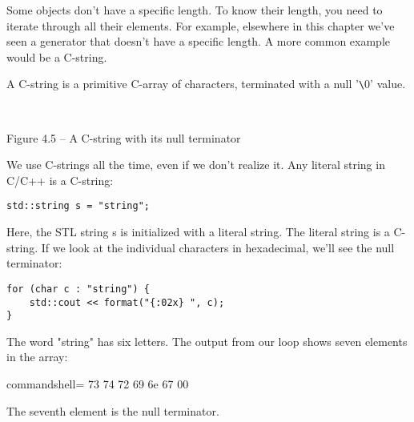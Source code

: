 
Some objects don't have a specific length. To know their length, you need to iterate through all their elements. For example, elsewhere in this chapter we've seen a generator that doesn't have a specific length. A more common example would be a C-string.

A C-string is a primitive C-array of characters, terminated with a null '\verb|\|0' value.


\hspace*{\fill} \\ %
\begin{center}

Figure 4.5 – A C-string with its null terminator
\end{center}

We use C-strings all the time, even if we don't realize it. Any literal string in C/C++ is a C-string:

\begin{lstlisting}[style=styleCXX]
std::string s = "string";
\end{lstlisting}

Here, the STL string s is initialized with a literal string. The literal string is a C-string. If we look at the individual characters in hexadecimal, we'll see the null terminator:

\begin{lstlisting}[style=styleCXX]
for (char c : "string") {
	std::cout << format("{:02x} ", c);
}
\end{lstlisting}

The word "string" has six letters. The output from our loop shows seven elements in the array:

\begin{tcblisting}{commandshell={}}
73 74 72 69 6e 67 00
\end{tcblisting}

The seventh element is the null terminator.


